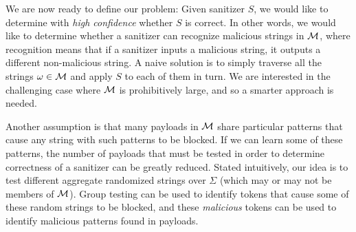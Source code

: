 We are now ready to define our problem: Given sanitizer $S$, we would like to determine with \emph{high confidence} whether $S$ is correct. In other words, we would like to determine whether a sanitizer can recognize malicious strings in $\cal{M}$, where recognition means that if a sanitizer inputs a malicious string, it outputs a different non-malicious string. A naive solution is to simply traverse all the strings $\omega \in {\cal M}$ and apply $S$ to each of them in turn. We are interested in the challenging case where ${\cal M}$ is prohibitively large, and so a smarter approach is needed.

Another assumption is that many payloads in $\cal{M}$ share particular patterns that cause any string with such patterns to be blocked. If we can learn some of these patterns, the number of payloads that must be tested in order to determine correctness of a sanitizer can be greatly reduced. Stated intuitively, our idea is to test different aggregate randomized strings over $\Sigma$ (which may or may not be members of ${\cal M}$). Group testing can be used to identify tokens that cause some of these random strings to be blocked, and these \emph{malicious} tokens can be used to identify malicious patterns found in payloads. 


